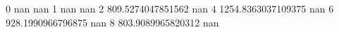 0 nan nan
1 nan nan
2 809.5274047851562 nan
4 1254.8363037109375 nan
6 928.1990966796875 nan
8 803.9089965820312 nan
